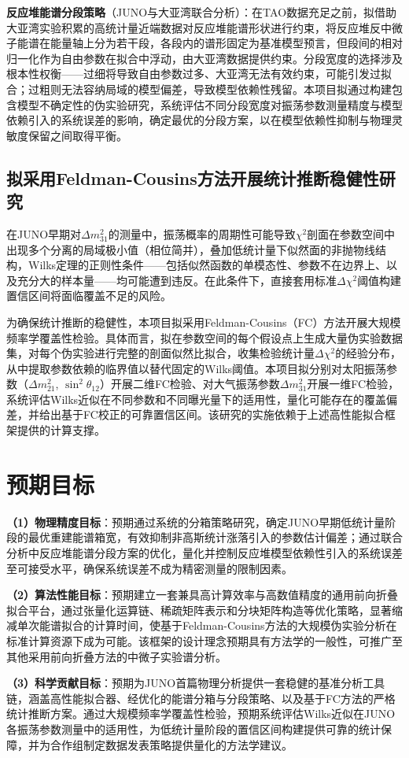 \documentclass[a4paper, 12pt, UTF8]{ctexart}
\begin{document}
\textbf{反应堆能谱分段策略}（JUNO与大亚湾联合分析）：在TAO数据充足之前，拟借助大亚湾实验积累的高统计量近端数据对反应堆能谱形状进行约束，将反应堆反中微子能谱在能量轴上分为若干段，各段内的谱形固定为基准模型预言，但段间的相对归一化作为自由参数在拟合中浮动，由大亚湾数据提供约束。分段宽度的选择涉及根本性权衡——过细将导致自由参数过多、大亚湾无法有效约束，可能引发过拟合；过粗则无法容纳局域的模型偏差，导致模型依赖性残留。本项目拟通过构建包含模型不确定性的伪实验研究，系统评估不同分段宽度对振荡参数测量精度与模型依赖引入的系统误差的影响，确定最优的分段方案，以在模型依赖性抑制与物理灵敏度保留之间取得平衡。

\subsection{拟采用Feldman-Cousins方法开展统计推断稳健性研究}

在JUNO早期对$\Delta m^2_{31}$的测量中，振荡概率的周期性可能导致$\chi^2$剖面在参数空间中出现多个分离的局域极小值（相位简并），叠加低统计量下似然面的非抛物线结构，Wilks定理的正则性条件——包括似然函数的单模态性、参数不在边界上、以及充分大的样本量——均可能遭到违反。在此条件下，直接套用标准$\Delta\chi^2$阈值构建置信区间将面临覆盖不足的风险。

为确保统计推断的稳健性，本项目拟采用Feldman-Cousins（FC）方法开展大规模频率学覆盖性检验。具体而言，拟在参数空间的每个假设点上生成大量伪实验数据集，对每个伪实验进行完整的剖面似然比拟合，收集检验统计量$\Delta\chi^2$的经验分布，从中提取参数依赖的临界值以替代固定的Wilks阈值。本项目拟分别对太阳振荡参数（$\Delta m^2_{21}$, $\sin^2\theta_{12}$）开展二维FC检验、对大气振荡参数$\Delta m^2_{31}$开展一维FC检验，系统评估Wilks近似在不同参数和不同曝光量下的适用性，量化可能存在的覆盖偏差，并给出基于FC校正的可靠置信区间。该研究的实施依赖于上述高性能拟合框架提供的计算支撑。

\section{预期目标}

\textbf{（1）物理精度目标}：预期通过系统的分箱策略研究，确定JUNO早期低统计量阶段的最优重建能谱箱宽，有效抑制非高斯统计涨落引入的参数估计偏差；通过联合分析中反应堆能谱分段方案的优化，量化并控制反应堆模型依赖性引入的系统误差至可接受水平，确保系统误差不成为精密测量的限制因素。

\textbf{（2）算法性能目标}：预期建立一套兼具高计算效率与高数值精度的通用前向折叠拟合平台，通过张量化运算链、稀疏矩阵表示和分块矩阵构造等优化策略，显著缩减单次能谱拟合的计算时间，使基于Feldman-Cousins方法的大规模伪实验分析在标准计算资源下成为可能。该框架的设计理念预期具有方法学的一般性，可推广至其他采用前向折叠方法的中微子实验谱分析。

\textbf{（3）科学贡献目标}：预期为JUNO首篇物理分析提供一套稳健的基准分析工具链，涵盖高性能拟合器、经优化的能谱分箱与分段策略、以及基于FC方法的严格统计推断方案。通过大规模频率学覆盖性检验，预期系统评估Wilks近似在JUNO各振荡参数测量中的适用性，为低统计量阶段的置信区间构建提供可靠的统计保障，并为合作组制定数据发表策略提供量化的方法学建议。
\end{document}
